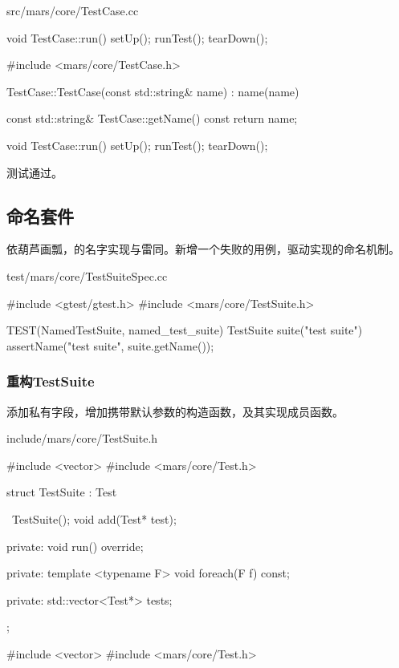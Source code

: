 \begin{content}
\begin{diff}{src/mars/core/TestCase.cc}
\begin{minicpp}
void TestCase::run() {
  setUp();
  runTest();
  tearDown();
}
 \end{minicpp}
\tcblower
 \begin{minicpp}
#include <mars/core/TestCase.h>

TestCase::TestCase(const std::string& name)
  : name(name) {}

const std::string& TestCase::getName() const {
  return name;
}

void TestCase::run() {
  setUp();
  runTest();
  tearDown();
}
 \end{minicpp}
\end{diff}

测试通过。

\subsection{命名套件}

依葫芦画瓢，的名字实现与雷同。新增一个失败的用例，驱动实现的命名机制。

\begin{nodiff}{test/mars/core/TestSuiteSpec.cc}
 \begin{c++}
#include <gtest/gtest.h>
#include <mars/core/TestSuite.h>

TEST(NamedTestSuite, named_test_suite) {
  TestSuite suite("test suite")
  assertName("test suite", suite.getName());
}
 \end{c++}
\end{nodiff}

\subsubsection{重构TestSuite}

添加私有字段，增加携带默认参数的构造函数，及其实现成员函数。

\begin{diff}{include/mars/core/TestSuite.h}
 \begin{minicpp}
#include <vector>
#include <mars/core/Test.h>

struct TestSuite : Test {
  ~TestSuite();
  void add(Test* test);

private:
  void run() override;

private:
  template <typename F>
  void foreach(F f) const;

private:
  std::vector<Test*> tests;
};
 \end{minicpp}
\tcblower
 \begin{minicpp}
#include <vector>
#include <mars/core/Test.h>


\end{minicpp}
\end{diff}
\end{content}
